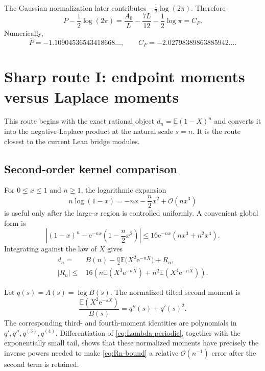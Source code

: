 \documentclass[11pt,oneside]{article}
\theoremstyle{definition}
\theoremstyle{remark}
\newcommand{\e}{\mathrm e}
\newcommand{\E}{\mathbb E}
\newcommand{\bigO}{\mathcal O}
\newcommand{\Lam}{\Lambda}
\begin{document}
The Gaussian normalization later contributes $-\tfrac12\log(2\pi)$.  Therefore
\begin{equation}
 \overline P-\frac12\log(2\pi)
 =\frac{A_0}{L}-\frac{7L}{12}-\frac12\log\pi
 =C_F.                                                       \label{eq:CF-from-P}
\end{equation}
Numerically,
\begin{equation}
 \overline P=-1.10904536543418668\ldots,
 \qquad
 C_F=-2.02798389863885942\ldots.                            \label{eq:constants-numeric}
\end{equation}

\section{Sharp route I: endpoint moments versus Laplace moments}
\label{sec:endpoint-laplace}

This route begins with the exact rational object $d_n=\E(1-X)^n$ and converts it into the
negative-Laplace product at the natural scale $s=n$.  It is the route closest to the current
Lean bridge modules.

\subsection{Second-order kernel comparison}

For $0\le x\le1$ and $n\ge1$, the logarithmic expansion
\begin{equation*}
 n\log(1-x)=-nx-\frac n2x^2+\bigO(nx^3)
\end{equation*}
is useful only after the large-$x$ region is controlled uniformly.  A convenient global
form is
\begin{equation}
 \left|(1-x)^n-\e^{-nx}\left(1-\frac n2x^2\right)\right|
 \le16\e^{-nx}(nx^3+n^2x^4).                               \label{eq:kernel-comparison}
\end{equation}
Integrating against the law of $X$ gives
\begin{align}
 d_n={}&B(n)-\frac n2\E\bigl(X^2\e^{-nX}\bigr)+R_n,        \label{eq:dn-B-second}\\
 |R_n|\le{}&16\left(
 n\E(X^3\e^{-nX})+n^2\E(X^4\e^{-nX})\right).              \label{eq:Rn-bound}
\end{align}

Let $q(s)=\Lam(s)=\log B(s)$.  The normalized tilted second moment is
\begin{equation}
 \frac{\E(X^2\e^{-sX})}{B(s)}=q''(s)+q'(s)^2.               \label{eq:tilted-second}
\end{equation}
The corresponding third- and fourth-moment identities are polynomials in
$q',q'',q^{(3)},q^{(4)}$.  Differentiation of \eqref{eq:Lambda-periodic}, together with the
exponentially small tail, shows that these normalized moments have precisely the inverse
powers needed to make \eqref{eq:Rn-bound} a relative $\bigO(n^{-1})$ error after the second
term is retained.
\end{document}

